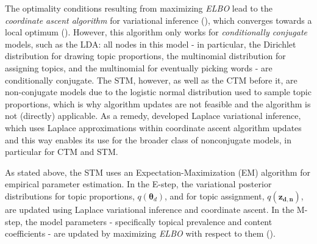 The optimality conditions resulting from maximizing \textit{ELBO} lead to the \textit{coordinate ascent algorithm} for variational inference (\citealp{wang2013variational}), which converges towards a local optimum (\citealp{bishop2006pattern}). However, this algorithm only works for \textit{conditionally conjugate} models, such as the LDA: all nodes in this model - in particular, the Dirichlet distribution for drawing topic proportions, the multinomial distribution for assigning topics, and the multinomial for eventually picking words - are conditionally conjugate. The STM, however, as well as the CTM before it, are non-conjugate models due to the logistic normal distribution used to sample topic proportions, which is why algorithm updates are not feasible and the algorithm is not (directly) applicable. As a remedy, \cite{wang2013variational} developed Laplace variational inference, which uses Laplace approximations within coordinate ascent algorithm updates and this way enables its use for the broader class of nonconjugate models, in particular for CTM and STM.

As stated above, the STM uses an Expectation-Maximization (EM) algorithm for empirical parameter estimation. In the E-step, the variational posterior distributions for topic proportions, $q(\boldsymbol{\theta}_d)$, and for topic assignment, $q(\boldsymbol{z_{d,n}})$, are updated using Laplace variational inference and coordinate ascent. In the M-step, the model parameters - specifically topical prevalence and content coefficients - are updated by maximizing \textit{ELBO} with respect to them (\citealp{roberts2016model}).